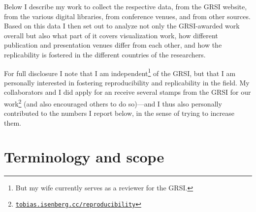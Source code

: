 \documentclass[conference]{vgtc}                     %
\begin{document}
\addtocounter{footnote}{-1}
\addtocounter{footnote}{1}

Below I describe my work to collect the respective data, from the GRSI website, from the various digital libraries, from conference venues, and from other sources. Based on this data I then set out to analyze not only the GRSI-awarded work overall but also what part of it covers visualization work, how different publication and presentation venues differ from each other, and how the replicability is fostered in the different countries of the researchers.

For full disclosure I note that I am independent\footnote{But my wife currently serves as a reviewer for the GRSI.} of the GRSI, but that I am personally interested in fostering reproducibility and replicability in the field. My collaborators and I did apply for an receive several stamps from the GRSI for our work\footnote{\href{https://tobias.isenberg.cc/reproducibility}{\texttt{tobias.isenberg.cc/reproducibility}}} (and also encouraged others to do so)---and I thus also personally contributed to the numbers I report below, in the sense of trying to increase them.

\section{Terminology and scope}
\label{sec:terminology}
\end{document}

